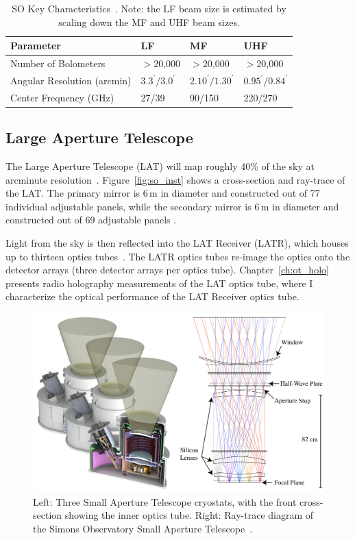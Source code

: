 \begin{table}[b]
    \centering
    \begin{tabular}{|l|l|l|l|} \hline
        \textbf{ Parameter} &  \textbf{LF} &  \textbf{MF}  &  \textbf{UHF}  \\ \hline \hline
        Number of Bolometers & $>$20,000& $>$20,000& $>$20,000\\\hline
        Angular Resolution (arcmin) & $3.3^{\prime}/3.0^{\prime}$ &$2.10^{\prime}/1.30^{\prime}$&$0.95^{\prime}/0.84^{\prime}$\\\hline
        Center Frequency (GHz) & 27/39 & 90/150 & 220/270\\\hline
    \end{tabular} \caption{SO Key Characteristics~\cite{Gudmundsson:21}.  Note: the LF beam size is estimated by scaling down the MF and UHF beam sizes.}
    \label{tab:so}
\end{table}

\subsection{Large Aperture Telescope}

The Large Aperture Telescope (LAT) will map roughly 40\% of the sky at arcminute resolution~\cite{xu/etal:2020c}.   Figure~\ref{fig:so_inst} shows a cross-section and ray-trace of the LAT.  The primary mirror is 6\,m in diameter and constructed out of 77 individual adjustable panels, while the secondary mirror is 6\,m in diameter and constructed out of 69 adjustable panels \cite{gali18}.

Light from the sky is then reflected into the LAT Receiver (LATR), which houses up to thirteen optics tubes~\cite{Xu_2021}.  The LATR optics tubes re-image the optics onto the detector arrays (three detector arrays per optics tube).  Chapter~\ref{ch:ot_holo} presents radio holography measurements of the LAT optics tube, where I characterize the optical performance of the LAT Receiver optics tube.

\begin{figure}[ht]
    \centering
    \includegraphics[width = \textwidth]{Figures/SAT3.pdf}
    \caption{Left: Three Small Aperture Telescope cryostats, with the front cross-section showing the inner optics tube.  Right: Ray-trace diagram of the Simons Observatory Small Aperture Telescope~\cite{2020SPIE11445E7LK}.}
    \label{fig:sat3s}
\end{figure}


